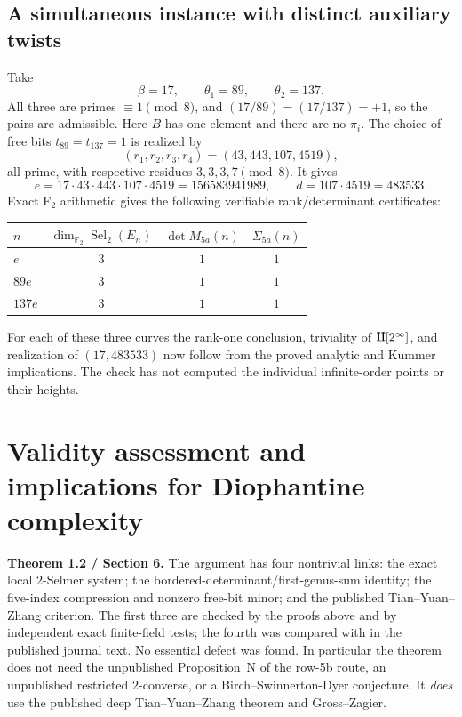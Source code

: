 \documentclass[11pt,a4paper]{article}
\theoremstyle{definition}
\newcommand{\FF}{\mathbb F_2}
\newcommand{\Sel}{\operatorname{Sel}_2}
\newcommand{\Sha}{\operatorname{\mathrlap{\mathchoice{\raisebox{.13ex}{$\displaystyle\amalg$}}{\raisebox{.13ex}{$\textstyle\amalg$}}{\amalg}{\amalg}}\amalg}}
\begin{document}
\subsection{A simultaneous instance with distinct auxiliary twists}

Take
\[
        \beta=17,\qquad
        \theta_1=89,\qquad\theta_2=137.
\]
All three are primes $\equiv1\pmod8$, and
$(17/89)=(17/137)=+1$, so the pairs are admissible.
Here $B$ has one element and there are no $\pi_i$.
The choice of free bits $t_{89}=t_{137}=1$ is realized by
\[
       (r_1,r_2,r_3,r_4)=(43,443,107,4519),
\]
all prime, with respective residues $3,3,3,7\pmod8$.
It gives
\[
 \boxed{\ e=17\cdot43\cdot443\cdot107\cdot4519
          =156583941989,\qquad d=107\cdot4519=483533.\ }
\]
Exact F$_2$ arithmetic gives the following verifiable
rank/determinant certificates:
\begin{center}
\begin{tabular}{@{}lccc@{}}
\toprule
$n$ & $\dim_{\FF}\Sel(E_n)$ & $\det M_{5a}(n)$
                                  & $\Sigma_{5a}(n)$\\
\midrule
$e$      & $3$ & $1$ & $1$\\
$89e$    & $3$ & $1$ & $1$\\
$137e$   & $3$ & $1$ & $1$\\
\bottomrule
\end{tabular}
\end{center}
For each of these three curves the rank-one conclusion,
triviality of $\Sha[2^\infty]$, and realization of
$(17,483533)$ now follow from the proved analytic and
Kummer implications.  The check has not computed the
individual infinite-order points or their heights.

\section{Validity assessment and implications for Diophantine complexity}\label{sec:audit}

\textbf{Theorem 1.2 / Section 6.}  The argument has four
nontrivial links: the exact local $2$-Selmer system;
the bordered-determinant/first-genus-sum identity;
the five-index compression and nonzero free-bit minor;
and the published Tian--Yuan--Zhang criterion.
The first three are checked by the proofs above and by
independent exact finite-field tests; the fourth was
compared with \cite[Theorem~1.4]{TYZ} in the published
journal text.  No essential defect was found.  In
particular the theorem does not need the unpublished
Proposition~N of the row-5b route, an unpublished
restricted $2$-converse, or a Birch--Swinnerton-Dyer
conjecture.  It \emph{does} use the published deep
Tian--Yuan--Zhang theorem and Gross--Zagier.
\end{document}
